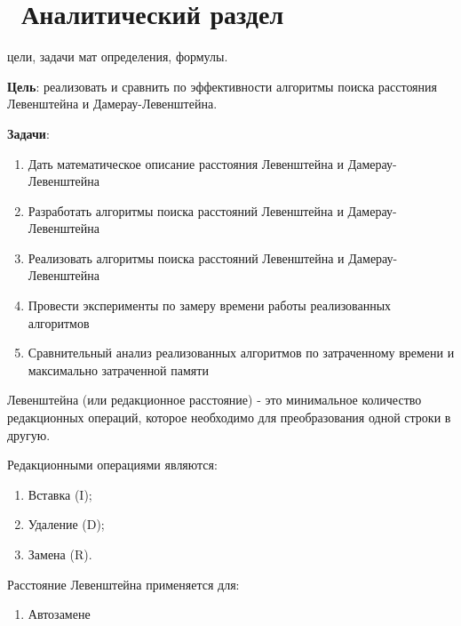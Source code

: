 \chapter{ Аналитический раздел}
\label{cha:analytical}
    цели, задачи мат определения, формулы.

    {\bf Цель}: реализовать и сравнить по эффективности алгоритмы поиска
    расстояния Левенштейна и Дамерау-Левенштейна.


    {\bf Задачи}:
    \begin{enumerate}[1)]
        \item Дать математическое описание расстояния Левенштейна и Дамерау-Левенштейна
        \item Разработать алгоритмы поиска расстояний Левенштейна и Дамерау-Левенштейна
        \item Реализовать алгоритмы поиска расстояний Левенштейна и Дамерау-Левенштейна
        \item Провести эксперименты по замеру времени работы реализованных алгоритмов
        \item Сравнительный анализ реализованных алгоритмов по затраченному времени и максимально затраченной памяти
    \end{enumerate}

    { Левенштейна} (или редакционное расстояние) - это минимальное
    количество редакционных операций, которое необходимо для преобразования одной строки в другую.

    Редакционными операциями являются: \begin{enumerate}[1)]
        \item Вставка (I);
        \item Удаление (D);
        \item Замена (R).
    \end{enumerate}

    Расстояние Левенштейна применяется для: \begin{enumerate}
        \item Автозамене
    \end{enumerate}
\newpage